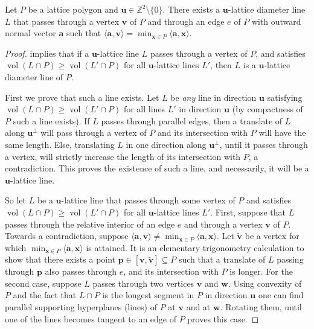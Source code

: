 \documentclass[11pt]{article}
\newcommand{\ba}{\mathbf{a}}
\newcommand{\bp}{\mathbf{p}}
\newcommand{\bu}{\mathbf{u}}
\newcommand{\bv}{\mathbf{v}}
\newcommand{\bw}{\mathbf{w}}
\newcommand{\bx}{\mathbf{x}}
\newcommand{\Z}{\mathbb{Z}}
\DeclareMathOperator{\vol}{vol}
\begin{document}
\begin{lemma}\cite[Lemma 1]{Barany_Furedi}\label{lemma:vertex_edge_pair}
Let $P$ be a lattice polygon and $\bu \in \Z^2 \setminus \{0\}$. There exists a $\bu$-lattice diameter line $L$ that passes through a vertex $\bv$ of $P$ and through an edge $e$ of $P$ with outward normal vector $\ba$ such that $\langle \ba, \bv \rangle = \min_{\bx \in P} \langle \ba,\bx \rangle$.
\end{lemma}


\begin{proof}
     implies that if a $\bu$-lattice line $L$ passes through a vertex of $P$, and satisfies $\vol(L\cap P) \geq \vol(L' \cap P)$ for all $\bu$-lattice lines $L'$, then $L$ is a $\bu$-lattice diameter line of $P$.

    First we prove that such a line exists. Let $L$ be \textit{any} line in direction $\bu$ satisfying $\vol(L\cap P) \geq \vol(L' \cap P)$ for all lines $L'$ in direction $\bu$ (by compactness of $P$ such a line exists). If $L$ passes through parallel edges, then a translate of $L$ along $\bu^{\perp}$ will pass through a vertex of $P$ and its intersection with $P$ will have the same length. Else, translating $L$ in one direction along $\bu^{\perp}$, until it passes through a vertex, will strictly increase the length of its intersection with $P$, a contradiction. This proves the existence of such a line, and necessarily, it will be a $\bu$-lattice line.
    
    So let $L$ be a $\bu$-lattice line that passes through some vertex of $P$ and satisfies
    $\vol(L\cap P) \geq \vol(L' \cap P)$ for all $\bu$-lattice lines $L'$.
    First, suppose that $L$ passes through the relative interior of an edge $e$ and through a vertex $\bv$ of $P$. Towards a contradiction, suppose $\langle \ba, \bv \rangle \neq \min_{\bx \in P} \langle \ba,\bx \rangle$. Let $\tilde{\bv}$ be a vertex for which $\min_{\bx \in P} \langle \ba,\bx \rangle$ is attained. It is an elementary trigonometry calculation to show that there exists a point $\bp \in [\bv,\tilde{\bv}] \subseteq P$ such that a translate of $L$ passing through $\bp$ also passes through $e$, and its intersection with $P$ is longer.
    For the second case, suppose $L$ passes through two vertices $\bv$ and $\bw$. Using convexity of $P$ and the fact that $L \cap P$ is the longest segment in $P$ in direction $\bu$ one can find parallel supporting hyperplanes (lines) of $P$ at $\bv$ and at $\bw$. Rotating them, until one of the lines becomes tangent to an edge of $P$ proves this case.
\end{proof}
\end{document}
